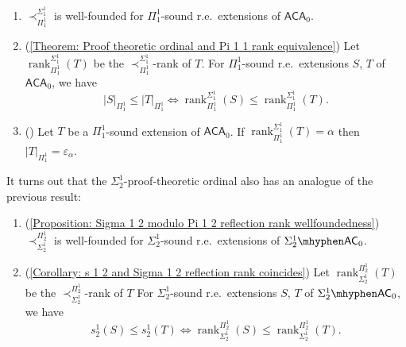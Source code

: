 \documentclass{mhkr}
\newcommand{\rank}{\operatorname{rank}}
\newcommand{\AC}{\mathsf{AC}}
\newcommand{\ACA}{\mathsf{ACA}}
\begin{document}
\begin{theorem*} \phantom{a}
    \begin{enumerate}
        \item $\prec^{\Sigma^1_1}_{\Pi^1_1}$ is well-founded for $\Pi^1_1$-sound r.e.\ extensions of $\ACA_0$.
        
        \item (\autoref{Theorem: Proof theoretic ordinal and Pi 1 1 rank equivalence}) Let $\rank^{\Sigma^1_1}_{\Pi^1_1}(T)$ be the $\prec^{\Sigma^1_1}_{\Pi^1_1}$-rank of $T$. For $\Pi^1_1$-sound r.e.\ extensions $S$, $T$ of $\ACA_0$, we have
        \begin{equation*}
            |S|_{\Pi^1_1}\le |T|_{\Pi^1_1} \iff \rank^{\Sigma^1_1}_{\Pi^1_1}(S)\le \rank^{\Sigma^1_1}_{\Pi^1_1}(T).
        \end{equation*}

        \item (\cite[Theorem 5.20]{PakhomovWalsh2021Reflection}) Let $T$ be a $\Pi^1_1$-sound extension of $\ACA_0$. If $\rank^{\Sigma^1_1}_{\Pi^1_1}(T)=\alpha$ then $|T|_{\Pi^1_1}=\varepsilon_\alpha$.
    \end{enumerate}
\end{theorem*}

It turns out that the $\Sigma^1_2$-proof-theoretic ordinal also has an analogue of the previous result:

\begin{theorem*} \phantom{a}
    \begin{enumerate}
        \item (\autoref{Proposition: Sigma 1 2 modulo Pi 1 2 reflection rank wellfoundedness}) $\prec^{\Pi^1_2}_{\Sigma^1_2}$ is well-founded for $\Sigma^1_2$-sound r.e.\ extensions of $\Sigma^1_2\mhyphen\AC_0$.
        
        \item (\autoref{Corollary: s 1 2 and Sigma 1 2 reflection rank coincides}) 
        Let $\rank^{\Pi^1_2}_{\Sigma^1_2}(T)$ be the $\prec^{\Pi^1_2}_{\Sigma^1_2}$-rank of $T$
        For $\Sigma^1_2$-sound r.e.\ extensions $S$, $T$ of $\Sigma^1_2\mhyphen\AC_0$,  we have
        \begin{equation*}
            s^1_2(S)\le s^1_2(T) \iff \rank^{\Pi^1_2}_{\Sigma^1_2}(S)\le \rank^{\Pi^1_2}_{\Sigma^1_2}(T).
        \end{equation*}
    \end{enumerate}
\end{theorem*}
\end{document}
